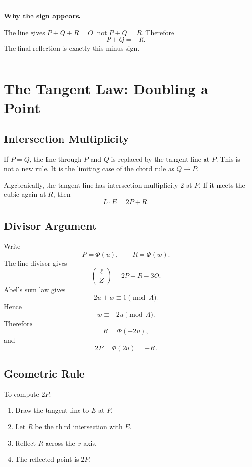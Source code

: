 \documentclass[11pt]{article}
\newenvironment{keyidea}[1]{%
  \par\medskip
  \begin{center}
  \begin{minipage}{0.92\textwidth}
  \hrule
  \smallskip
  \textbf{#1.}\quad\ignorespaces
}{%
  \smallskip
  \hrule
  \end{minipage}
  \end{center}
  \medskip
}
\begin{document}
\begin{keyidea}{Why the sign appears}
The line gives \(P+Q+R=O\), not \(P+Q=R\).  Therefore
\[
P+Q=-R.
\]
The final reflection is exactly this minus sign.
\end{keyidea}

\section{The Tangent Law: Doubling a Point}

\subsection{Intersection Multiplicity}

If \(P=Q\), the line through \(P\) and \(Q\) is replaced by the tangent line
at \(P\).  This is not a new rule.  It is the limiting case of the chord
rule as \(Q\to P\).

Algebraically, the tangent line has intersection multiplicity \(2\) at
\(P\).  If it meets the cubic again at \(R\), then
\[
L\cdot E=2P+R.
\]

\subsection{Divisor Argument}

Write
\[
P=\Phi(u),\qquad R=\Phi(w).
\]
The line divisor gives
\[
\left(\frac{\ell}{Z}\right)=2P+R-3O.
\]
Abel's sum law gives
\[
2u+w\equiv0\pmod{\Lambda}.
\]
Hence
\[
w\equiv-2u\pmod{\Lambda}.
\]
Therefore
\[
R=\Phi(-2u),
\]
and
\[
2P=\Phi(2u)=-R.
\]

\subsection{Geometric Rule}

To compute \(2P\):

\begin{enumerate}
\item Draw the tangent line to \(E\) at \(P\).
\item Let \(R\) be the third intersection with \(E\).
\item Reflect \(R\) across the \(x\)-axis.
\item The reflected point is \(2P\).
\end{enumerate}
\end{document}
